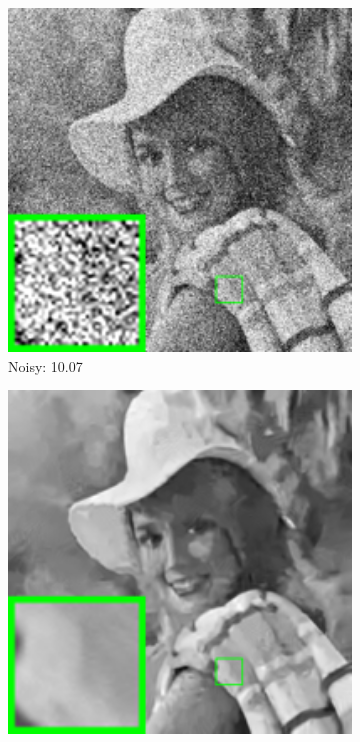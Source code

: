 \begin{figure}
\begin{adjustwidth}{-2cm}{}
\begin{subfigure}[t]{0.19\textwidth}
        \includegraphics[width=1\textwidth]{images/twsc/awgn/resize_br_80_elaine.png}
		\caption{Noisy: 10.07}
    \end{subfigure}
    \hfill
    \begin{subfigure}[t]{0.19\textwidth}
        \centering
        \includegraphics[width=1\textwidth]{images/twsc/awgn/resize_br_BM3D_80_elaine.png}

\end{subfigure}
\end{adjustwidth}
\end{figure}
